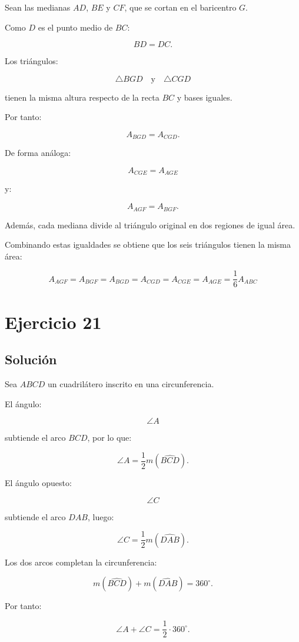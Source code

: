 \documentclass[11pt,a4paper]{article}
\begin{document}
Sean las medianas \(AD\), \(BE\) y \(CF\), que se cortan en el baricentro \(G\).

Como \(D\) es el punto medio de \(BC\):

\[
BD=DC.
\]

Los triángulos:

\[
\triangle BGD
\quad\text{y}\quad
\triangle CGD
\]

tienen la misma altura respecto de la recta \(BC\) y bases iguales.

Por tanto:

\[
A_{BGD}=A_{CGD}.
\]

De forma análoga:

\[
A_{CGE}=A_{AGE}
\]

y:

\[
A_{AGF}=A_{BGF}.
\]

Además, cada mediana divide al triángulo original en dos regiones de igual área.

Combinando estas igualdades se obtiene que los seis triángulos tienen la misma área:

\[
\boxed{
A_{AGF}
=
A_{BGF}
=
A_{BGD}
=
A_{CGD}
=
A_{CGE}
=
A_{AGE}
=
\frac16A_{ABC}
}
\]

\section{Ejercicio 21}
\subsection{Solución}

Sea \(ABCD\) un cuadrilátero inscrito en una circunferencia.

El ángulo:

\[
\angle A
\]

subtiende el arco \(BCD\), por lo que:

\[
\angle A
=
\frac12
m(\widehat{BCD}).
\]

El ángulo opuesto:

\[
\angle C
\]

subtiende el arco \(DAB\), luego:

\[
\angle C
=
\frac12
m(\widehat{DAB}).
\]

Los dos arcos completan la circunferencia:

\[
m(\widehat{BCD})
+
m(\widehat{DAB})
=
360^\circ.
\]

Por tanto:

\[
\angle A+\angle C
=
\frac12\cdot360^\circ.
\]
\end{document}

